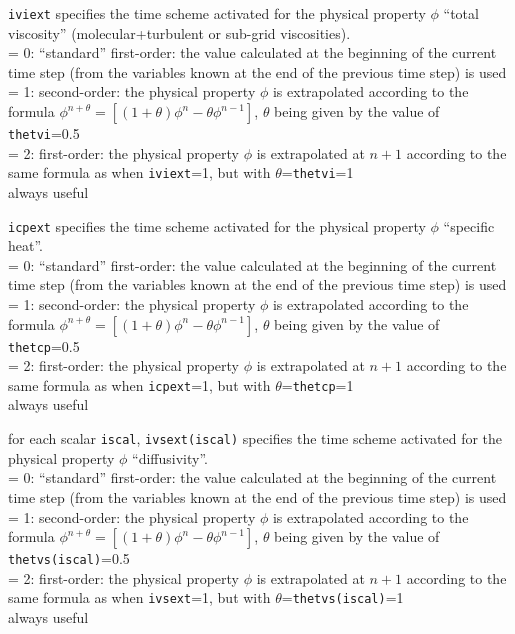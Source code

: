 {{\tt iviext} specifies the time scheme activated
for the physical property $\phi$ ``total viscosity''
(molecular+turbulent or sub-grid viscosities).\\
\hspace*{1.3cm}= 0: ``standard'' first-order: the value calculated at
the beginning of the current time step (from the
variables known at the end of the previous time step) is used \\
\hspace*{1.3cm}= 1: second-order: the physical property $\phi$ is
extrapolated according to the formula
$\phi^{n+\theta}=[(1+\theta)\phi^n-\theta \phi^{n-1}]$, $\theta$ being
given by the value of {\tt thetvi}=0.5 \\
\hspace*{1.3cm}= 2: first-order: the physical property $\phi$ is
extrapolated at $n+1$ according to the
same formula as when {\tt iviext}=1, but with $\theta$={\tt thetvi}=1\\
always useful}

{{\tt icpext} specifies the time scheme activated
for the physical property $\phi$ ``specific heat''.\\
\hspace*{1.3cm}= 0: ``standard'' first-order: the value calculated at
the beginning of the current time step (from the
variables known at the end of the previous time step) is used \\
\hspace*{1.3cm}= 1: second-order: the physical property $\phi$ is
extrapolated according to the formula
$\phi^{n+\theta}=[(1+\theta)\phi^n-\theta \phi^{n-1}]$, $\theta$ being
given by the value of {\tt thetcp}=0.5 \\
\hspace*{1.3cm}= 2: first-order: the physical property $\phi$ is
extrapolated at $n+1$ according to the
same formula as when {\tt icpext}=1, but with $\theta$={\tt thetcp}=1\\
always useful}

{for each scalar {\tt iscal}, {\tt ivsext(iscal)} specifies the time scheme
activated for the physical property $\phi$ ``diffusivity''.\\
\hspace*{1.3cm}= 0: ``standard'' first-order: the value calculated at
the beginning of the current time step (from the
variables known at the end of the previous time step) is used \\
\hspace*{1.3cm}= 1: second-order: the physical property $\phi$ is
extrapolated according to the formula
$\phi^{n+\theta}=[(1+\theta)\phi^n-\theta \phi^{n-1}]$, $\theta$ being
given by the value of {\tt thetvs(iscal)}=0.5 \\
\hspace*{1.3cm}= 2: first-order: the physical property $\phi$ is
extrapolated at $n+1$ according to the
same formula as when {\tt ivsext}=1, but with $\theta$={\tt thetvs(iscal)}=1\\
always useful}

